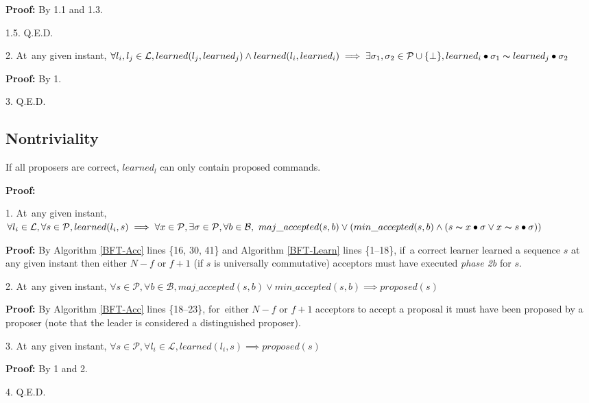 \documentclass[algorithms,article,accept,moreauthors,pdftex,10pt,a4paper]{Definitions/mdpi}
\begin{document}
\indent\indent\indent\indent\parbox{\linewidth}{\strut\textbf{Proof:} By 1.1 and 1.3.}\par
\indent\indent\indent\parbox{\linewidth}{\strut1.5. Q.E.D. }\par
\parbox{\linewidth-7mm-\algorithmicindent*3}{\strut2. At~any given instant, $\forall l_i,l_j \in \mathcal{L}, learned(l_j,learned_j) \land learned(l_i,learned_i) \implies \exists \sigma_1,\sigma_2 \in \mathcal{P} \cup \{\bot\}, learned_i \bullet \sigma_1 \thicksim learned_j \bullet \sigma_2$}\par
\indent\indent\parbox{\linewidth}{\strut\textbf{Proof:} By 1.}\par
\parbox{\linewidth}{\strut3. Q.E.D.} \par

\subsection{Nontriviality}
\begin{Theorem}
If all proposers are correct, $learned_l$ can only contain proposed commands. \label{N-T1} \par
\end{Theorem} 
\noindent\textbf{Proof:} \par
\parbox{\linewidth-2mm-\algorithmicindent}{\strut1. At~any given instant, $\forall l_i \in \mathcal{L}, \forall s \in \mathcal{P}, learned(l_i,s) \implies \forall x \in \mathcal{P}, \exists \sigma \in \mathcal{P}, \forall b \in \mathcal{B}, \ maj\_accepted(s,b) \lor (min\_accepted(s,b) \land (s \thicksim x \bullet \sigma \lor x \thicksim s \bullet \sigma))$ }\par
\indent\indent\parbox{\linewidth-4mm-\algorithmicindent*2}{\strut\textbf{Proof:} By Algorithm \ref{BFT-Acc} lines \{16, 30, 41\} and Algorithm \ref{BFT-Learn} lines \{1--18\}, if~a correct learner learned a sequence $s$ at any given instant then either $N-f$ or $f+1$ (if $s$ is universally commutative) acceptors must have executed \textit{phase 2b} for $s$.}\par
\parbox{\linewidth-2mm-\algorithmicindent}{\strut2. At~any given instant, $\forall s \in \mathcal{P}, \forall b \in \mathcal{B}, maj\_accepted(s,b) \lor min\_accepted(s,b) \implies proposed(s)$ }\par
\indent\indent\parbox{\linewidth-4.5mm-\algorithmicindent*2}{\strut\textbf{Proof:} By Algorithm \ref{BFT-Acc} lines \{18--23\}, for~either $N-f$ or $f+1$ acceptors to accept a proposal it must have been proposed by a proposer (note that the leader is considered a distinguished proposer).}\par
\parbox{\linewidth}{\strut3. At~any given instant, $\forall s \in \mathcal{P}, \forall l_i \in \mathcal{L}, learned(l_i,s) \implies proposed(s)$}\par
\indent\indent\parbox{\linewidth}{\strut\textbf{Proof:} By 1 and 2.}\par
\parbox{\linewidth}{\strut4. Q.E.D.}\par
\end{document}
